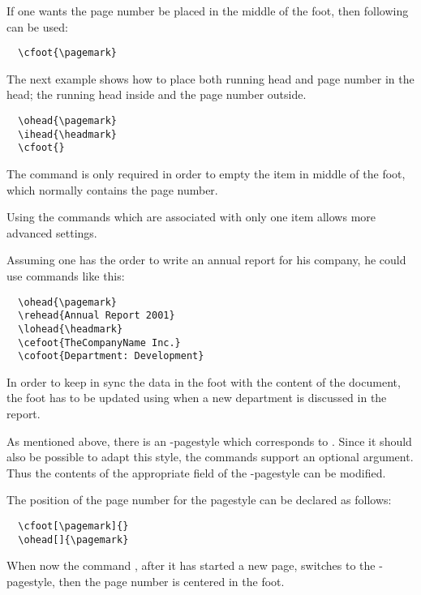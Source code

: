 \begin{Example}
If one wants the page number be placed in the middle of the
foot, then following can be used:
\begin{lstlisting}
  \cfoot{\pagemark}
\end{lstlisting}
The next example shows how to place both running head and
page number in the head; the running head inside and the page number
outside.
\begin{lstlisting}
  \ohead{\pagemark}
  \ihead{\headmark}
  \cfoot{}
\end{lstlisting}
The command \PParameter{} is only required in order
to empty the item in middle of the foot,
which normally contains the page number.
\end{Example}

Using the commands which are associated with only one item
allows more advanced settings.

\begin{Example}
Assuming one has the order to write an annual report for his
company, he could use commands like this:
\begin{lstlisting}
  \ohead{\pagemark}
  \rehead{Annual Report 2001}
  \lohead{\headmark}
  \cefoot{TheCompanyName Inc.}
  \cofoot{Department: Development}
\end{lstlisting}
In order to keep in sync the data in the foot with the content
of the document, the foot has to be updated using 
when a new department is discussed in the report.
\end{Example}

As mentioned above, there is an -pagestyle which corresponds to
. Since it should also be possible to adapt this style,
the commands support an optional argument. Thus the contents of the
appropriate field of the -pagestyle can be modified.

\begin{Example}
The position of the page number for the pagestyle 
can be declared as follows:
\begin{lstlisting}
  \cfoot[\pagemark]{}
  \ohead[]{\pagemark}
\end{lstlisting}
When now the command , after it has started a new page,
switches to the -pagestyle, then the page number
is centered in the foot.
\end{Example}
%
%

